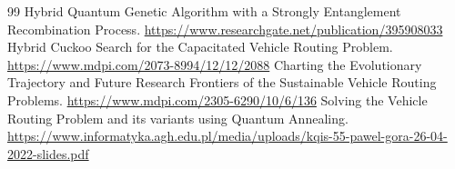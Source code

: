 \documentclass[a4paper, 11pt]{article}
\begin{document}
\begin{thebibliography}{99}
 Hybrid Quantum Genetic Algorithm with a Strongly Entanglement Recombination Process. \url{https://www.researchgate.net/publication/395908033}
 Hybrid Cuckoo Search for the Capacitated Vehicle Routing Problem. \url{https://www.mdpi.com/2073-8994/12/12/2088}
 Charting the Evolutionary Trajectory and Future Research Frontiers of the Sustainable Vehicle Routing Problems. \url{https://www.mdpi.com/2305-6290/10/6/136}
 Solving the Vehicle Routing Problem and its variants using Quantum Annealing. \url{https://www.informatyka.agh.edu.pl/media/uploads/kqis-55-pawel-gora-26-04-2022-slides.pdf}
\end{thebibliography}
\end{document}
